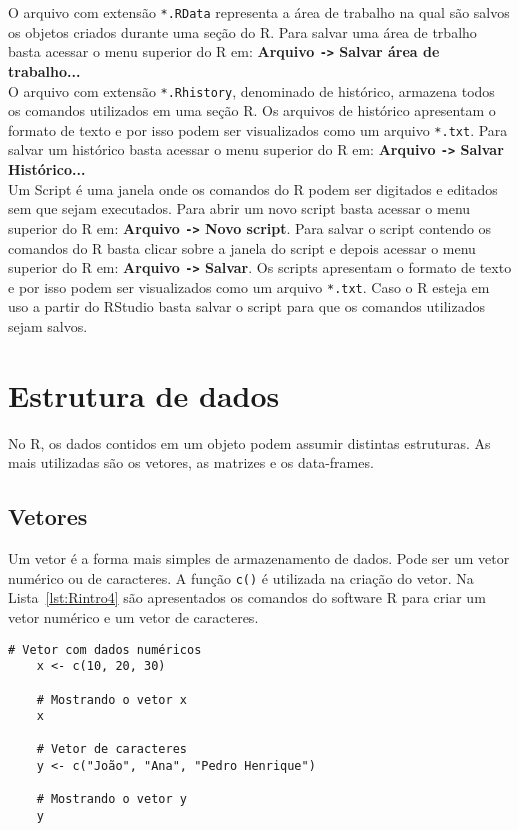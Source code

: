 \documentclass[11pt,fleqn]{book} %
\begin{document}
O arquivo com extensão \texttt{*.RData} representa a área de trabalho na qual são salvos os objetos criados durante uma seção do R. Para salvar uma área de trbalho basta acessar o menu superior do R em: {\bf Arquivo \texttt{->} Salvar área de trabalho...} \\

O arquivo com extensão \texttt{*.Rhistory}, denominado de histórico, armazena todos os comandos utilizados em uma seção R. Os arquivos de histórico apresentam o formato de texto e por isso podem ser visualizados como um arquivo \texttt{*.txt}. Para salvar um histórico basta acessar o menu superior do R em: {\bf Arquivo \texttt{->} Salvar Histórico...} \\

Um Script é uma janela onde os comandos do R podem ser digitados e editados sem que sejam executados. Para abrir um novo script basta acessar o menu superior do R em: {\bf Arquivo \texttt{->} Novo script}. Para salvar o script contendo os comandos do R basta clicar sobre a janela do script e depois acessar o menu superior do R em: {\bf Arquivo \texttt{->} Salvar}. Os scripts apresentam o formato de texto e por isso podem ser visualizados como um arquivo \texttt{*.txt}. Caso o R esteja em uso a partir do RStudio basta salvar o script para que os comandos utilizados sejam salvos.



\section{Estrutura de dados}

No R, os dados contidos em um objeto podem assumir distintas estruturas. As mais utilizadas são os vetores, as matrizes e os data-frames.	


\subsection{Vetores}

Um vetor é a forma mais simples de armazenamento de dados. Pode ser um vetor numérico ou de caracteres. A função \texttt{c()} é utilizada na criação do vetor. Na Lista~\ref{lst:Rintro4} são apresentados os comandos do software R para criar um vetor numérico e um vetor de caracteres. \\

\begin{scriptsize}
	\estiloR
	\begin{lstlisting}[caption={Comandos do software R}, label=lst:Rintro4]
	# Vetor com dados numéricos
	x <- c(10, 20, 30)
	
	# Mostrando o vetor x
	x
	
	# Vetor de caracteres
	y <- c("João", "Ana", "Pedro Henrique")
	
	# Mostrando o vetor y
	y	
	
	\end{lstlisting}
\end{scriptsize}
\end{document}
